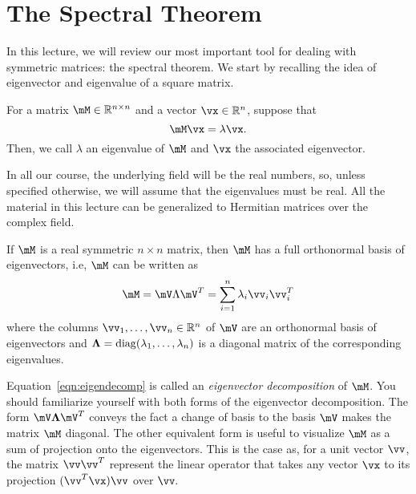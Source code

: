 \section{The Spectral Theorem}

In this lecture, we will review our most important tool for dealing with symmetric matrices: the spectral theorem. We start by recalling the idea of eigenvector and eigenvalue of a square matrix.

\begin{definition} %
For a matrix $\mM \in \R^{n \times n}$ and a vector $\vx \in \R^n$, suppose that
$$  
\mM\vx = \lambda \vx.
$$
Then, we call  $\lambda$ an \textrm{eigenvalue} of $\mM$ and $\vx$ the associated \textrm{eigenvector}.
\end{definition}
In all our course, the underlying field will be the real numbers, so, unless specified otherwise, we will assume that the eigenvalues must be real. All the material in this lecture can be generalized to Hermitian matrices over the complex field.


\begin{theorem} \label{thm:spectral}
If $\mM$ is a real symmetric $n\times n$ matrix, then $\mM$ has a full orthonormal basis of eigenvectors, i.e, $\mM$ can be written as
\begin{align}\label{eqn:eigendecomp}
\mM = \mV \Lambda \mV^T = \sum_{i=1}^{n} \lambda_i \vv_i \vv_i^T
\end{align}
where the columns $\vv_1, \ldots, \vv_n \in \R^n$ of $\mV$ are an orthonormal basis of eigenvectors and $\mathbf{\Lambda}=\operatorname{diag}(\lambda_1, \ldots, \lambda_n)$ is a diagonal matrix of the corresponding eigenvalues.
\end{theorem}
Equation~\ref{eqn:eigendecomp} is called an {\it eigenvector decomposition} of $\mM$. You should familiarize yourself with both forms of the eigenvector decomposition. The form $\mV \mathbf{\Lambda} \mV^T$ conveys the fact a change of basis to the basis $\mV$ makes the matrix $\mM$ diagonal. The other equivalent form is useful to visualize $\mM$ as a sum of projection onto the eigenvectors. This is the case as, for a unit vector $\vv$, the matrix $\vv\vv^T$ represent the linear operator that takes any vector $\vx$ to its projection  $(\vv^T \vx) \vv$ over $\vv.$


